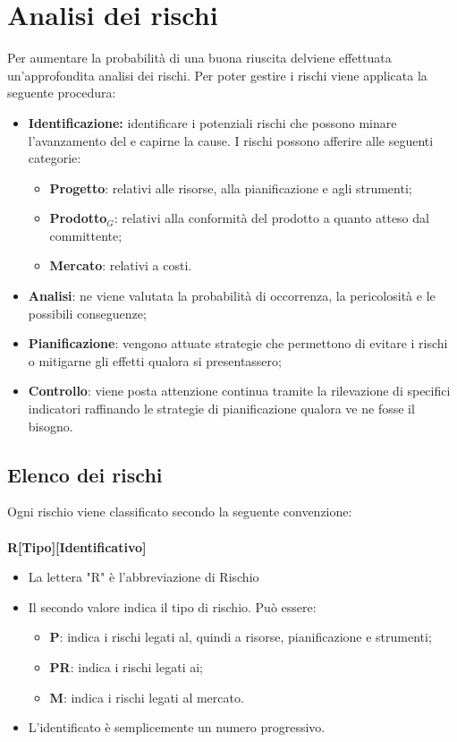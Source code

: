 \chapter{Analisi dei rischi}
Per aumentare la probabilità di una buona riuscita delviene effettuata un'approfondita analisi dei rischi. Per poter gestire i rischi viene applicata la seguente procedura:
\begin{itemize}
	\item \textbf{Identificazione:} identificare i potenziali rischi che possono minare l'avanzamento del  e capirne la cause. I rischi possono afferire alle seguenti categorie:
	\begin{itemize}
		\item \textbf{Progetto}: relativi alle risorse, alla pianificazione e agli strumenti;
		\item \textbf{Prodotto$_{G}$}: relativi alla conformità del prodotto a quanto atteso dal committente;
		\item \textbf{Mercato}: relativi a costi.
	\end{itemize}
	\item \textbf{Analisi}: ne viene valutata la probabilità di occorrenza, la pericolosità e le possibili conseguenze;
	\item \textbf{Pianificazione}: vengono attuate strategie che permettono di evitare i rischi o mitigarne gli effetti qualora si presentassero;
	\item \textbf{Controllo}: viene posta attenzione continua tramite la rilevazione di specifici indicatori raffinando le strategie di pianificazione qualora ve ne fosse il bisogno.
\end{itemize}
\section{Elenco dei rischi}
Ogni rischio viene classificato secondo la seguente convenzione:\\\\
\centering \textbf{R[Tipo][Identificativo]}\\
\begin{itemize}
	\item La lettera "R" è l'abbreviazione di Rischio
	\item Il secondo valore indica il tipo di rischio. Può essere:
	\begin{itemize}
		\item \textbf{P}: indica i rischi legati al, quindi a risorse, pianificazione e strumenti;
		\item \textbf{PR}: indica i rischi legati ai;
		\item \textbf{M}: indica i rischi legati al mercato.
	\end{itemize}
	\item L'identificato è semplicemente un numero progressivo.
\end{itemize}


